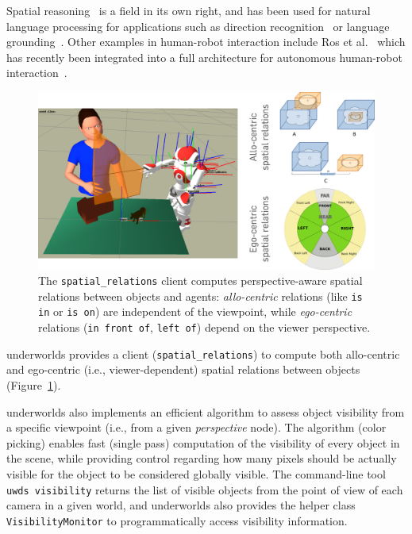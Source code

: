 \documentclass[conference]{IEEEtran}
\newcommand{\etal}{et al.\xspace}
\newcommand{\ie}{i.e.,\xspace}
\newcommand{\uwds}{{\sc underworlds}\xspace}
\begin{document}
Spatial reasoning~\cite{O'Keefe1999} is a field in its own right, and has been
used for natural language processing for applications such as direction
recognition~\cite{Kollar2010,Matuszek2010} or language
grounding~\cite{Tellex2010}. Other examples in human-robot interaction include Ros
\etal~\cite{ros2010solving, ros2010which} which has recently been integrated
into a full architecture for autonomous human-robot
interaction~\cite{lemaignan2016artificial}.

\begin{figure}
    \centering
    \includegraphics[width=\linewidth]{spatialrelations}
    \caption{The {\tt spatial\_relations} client computes perspective-aware
    spatial relations between objects and agents: \emph{allo-centric} relations (like
    {\tt is in} or {\tt is on}) are independent of the viewpoint, while
    \emph{ego-centric} relations ({\tt in front of}, {\tt left of}) depend on
    the viewer perspective.}
    \label{fig|spatialrelations}
\end{figure}

\uwds provides a client ({\tt spatial\_relations}) to compute both
allo-centric and ego-centric (\ie viewer-dependent) spatial relations
between objects (Figure~\ref{fig|spatialrelations}).


\uwds also implements an efficient algorithm to assess object visibility from a
specific viewpoint (\ie from a given \emph{perspective} node). The algorithm (color
picking) enables fast (single pass) computation of the visibility of every
object in the scene, while providing control regarding how many pixels should be actually
visible for the object to be considered globally visible. The
command-line tool {\tt uwds visibility} returns the list of visible objects from
the point of view of each camera in a given world, and \uwds also provides the
helper class {\tt VisibilityMonitor} to programmatically access visibility
information.
\end{document}
